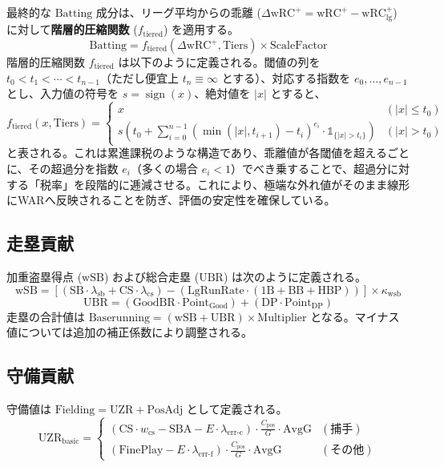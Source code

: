 \documentclass[uplatex,a4paper,11pt,dvipdfmx]{jsarticle}
\newcommand{\mvar}[1]{\mathrm{#1}}
\begin{document}
最終的な $\mvar{Batting}$ 成分は、リーグ平均からの乖離 ($\Delta \mvar{wRC}^+ = \mvar{wRC}^+ - \mvar{wRC}^+_{\text{lg}}$) に対して\textbf{階層的圧縮関数} ($f_{\text{tiered}}$) を適用する。
\begin{equation}
\mvar{Batting} = f_{\text{tiered}}(\Delta \mvar{wRC}^+, \mvar{Tiers}) \times \mvar{ScaleFactor}
\end{equation}
階層的圧縮関数 $f_{\text{tiered}}$ は以下のように定義される。閾値の列を $t_0 < t_1 < \cdots < t_{n-1}$（ただし便宜上 $t_n \equiv \infty$ とする）、対応する指数を $e_0, \ldots, e_{n-1}$ とし、入力値の符号を $s = \operatorname{sign}(x)$、絶対値を $|x|$ とすると、
\begin{equation}
f_{\text{tiered}}(x, \mvar{Tiers}) =
\begin{cases}
x & (|x| \le t_0) \\
s \left( t_0 + \displaystyle\sum_{i=0}^{n-1} \left(\min(|x|, t_{i+1}) - t_i\right)^{e_i} \cdot \mathbb{1}_{\{|x| > t_i\}} \right) & (|x| > t_0)
\end{cases}
\end{equation}
と表される。これは累進課税のような構造であり、乖離値が各閾値を超えるごとに、その超過分を指数 $e_i$（多くの場合 $e_i < 1$）でべき乗することで、超過分に対する「税率」を段階的に逓減させる。これにより、極端な外れ値がそのまま線形にWARへ反映されることを防ぎ、評価の安定性を確保している。

\subsection{走塁貢献}
加重盗塁得点 ($\mvar{wSB}$) および総合走塁 ($\mvar{UBR}$) は次のように定義される。
\begin{equation}
\mvar{wSB} = \left[ (\mvar{SB} \cdot \lambda_{\text{sb}} + \mvar{CS} \cdot \lambda_{\text{cs}}) - (\mvar{LgRunRate} \cdot (\mvar{1B} + \mvar{BB} + \mvar{HBP})) \right] \times \kappa_{\text{wsb}}
\end{equation}
\begin{equation}
\mvar{UBR} = (\mvar{GoodBR} \cdot \mvar{Point}_{\text{Good}}) + (\mvar{DP} \cdot \mvar{Point}_{\text{DP}})
\end{equation}
走塁の合計値は $\mvar{Baserunning} = (\mvar{wSB} + \mvar{UBR}) \times \mvar{Multiplier}$ となる。マイナス値については追加の補正係数により調整される。

\subsection{守備貢献}
守備値は $\mvar{Fielding} = \mvar{UZR} + \mvar{PosAdj}$ として定義される。
\begin{equation}
\mvar{UZR}_{\text{basic}} = \begin{cases}
(\mvar{CS} \cdot w_{\text{cs}} - \mvar{SBA} - E \cdot \lambda_{\text{err-c}}) \cdot \frac{C_{\text{pos}}}{G} \cdot \mvar{AvgG} & (\text{捕手}) \\
(\mvar{FinePlay} - E \cdot \lambda_{\text{err-f}}) \cdot \frac{C_{\text{pos}}}{G} \cdot \mvar{AvgG} & (\text{その他})
\end{cases}
\end{equation}
\end{document}
